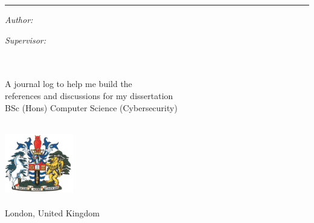 \begin{titlepage}
  \doublespacing{}
  \large
  \hfill
  \vfill
  \vspace*{0.5cm}
  \begin{center}
    \doublespacing{}
    \textcolor{Blue}{\huge\textbf{\myTitle}}
  \end{center}
  \vspace{1.25cm}
  \hrule
  \vspace{1.5cm}
  \onehalfspacing{}
  \begin{center}

    \begin{minipage}[t]{0.5\textwidth}
      \begin{flushleft}
        \emph{Author:}\\
        \href{\myWebsite}{{\myFirstName} \textsc{\myLastName}}
      \end{flushleft}
    \end{minipage}
    \begin{minipage}[t]{0.4\textwidth}
      \begin{flushright}
        \emph{Supervisor:} \\
        \href{\myProfWebsite}{{\myProfTitle} {\myProfFirstName} \textsc{\myProfLastName}}\\
      \end{flushright}
    \end{minipage}\\[1.5cm]

    A journal log to help me build the\\
    references and discussions for my dissertation\\
    {BSc (Hons) Computer Science (Cybersecurity)}\\[1cm]

    \myDepartment\\
    \myFaculty{}

    \hfill
    \vfill

    \includegraphics[width=3cm]{../shared/greenwich-coat-of-arms}\\
    \href{https://www.gre.ac.uk/}{\myUni}\\
    London, United Kingdom\\[2em]
    {\mySubmissionMonth} {\mySubmissionYear}
  \end{center}
\end{titlepage}
